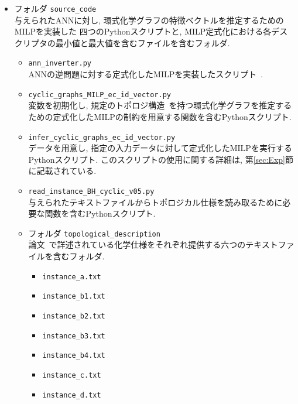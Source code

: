 \documentclass[11pt, titlepage, dvipdfmx, twoside]{jarticle}
\begin{document}
\begin{itemize}

\item フォルダ {\tt source\_code}\\
  与えられたANNに対し, 
  環式化学グラフの特徴ベクトルを推定するためのMILPを実装した
  四つのPythonスクリプトと, 
  MILP定式化における各デスクリプタの最小値と最大値を含むファイルを含むフォルダ. 

\begin{itemize}

\item {\tt ann\_inverter.py}\\
ANNの逆問題に対する定式化したMILPを実装したスクリプト~\cite{AN19}.

\item {\tt cyclic\_graphs\_MILP\_ec\_id\_vector.py}\\
変数を初期化し, 規定のトポロジ構造~\cite{cyclic_BH_arxiv}を持つ環式化学グラフを推定するための定式化したMILPの制約を用意する関数を含むPythonスクリプト. 

\item {\tt infer\_cyclic\_graphs\_ec\_id\_vector.py}\\
データを用意し, 指定の入力データに対して定式化したMILPを実行するPythonスクリプト. 
このスクリプトの使用に関する詳細は, 第\ref{sec:Exp}節に記載されている. 

\item {\tt read\_instance\_BH\_cyclic\_v05.py}\\
与えられたテキストファイルからトポロジカル仕様を読み取るために必要な関数を含むPythonスクリプト. 

\item フォルダ {\tt topological\_description}\\
論文~\cite{cyclic_BH_arxiv}で詳述されている化学仕様をそれぞれ提供する六つのテキストファイルを含むフォルダ. 
%
\begin{itemize}
 \item {\tt instance\_a.txt}
 \item {\tt instance\_b1.txt}
 \item {\tt instance\_b2.txt}
 \item {\tt instance\_b3.txt}
 \item {\tt instance\_b4.txt}
 \item {\tt instance\_c.txt}
 \item {\tt instance\_d.txt}
\end{itemize}


\end{itemize}
\end{itemize}
\end{document}
